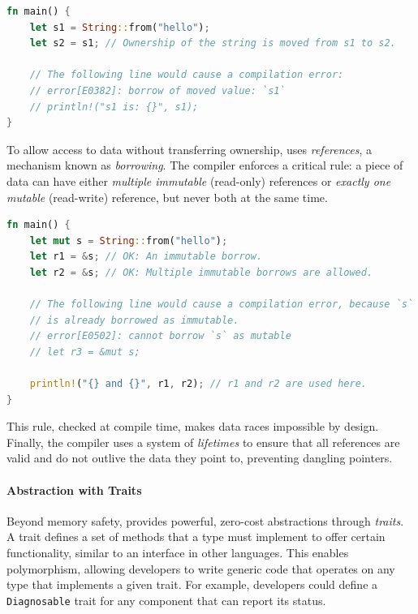 \begin{lstlisting}[language=Rust]
fn main() {
    let s1 = String::from("hello");
    let s2 = s1; // Ownership of the string is moved from s1 to s2.

    // The following line would cause a compilation error:
    // error[E0382]: borrow of moved value: `s1`
    // println!("s1 is: {}", s1);
}
\end{lstlisting}

To allow access to data without transferring ownership, \Rust uses \emph{references}, a mechanism
known as \emph{borrowing}. The compiler enforces a critical rule: a piece of data can have either
\emph{multiple immutable} (read-only) references or \emph{exactly one mutable} (read-write)
reference, but never both at the same time.

\begin{lstlisting}[language=Rust]
fn main() {
    let mut s = String::from("hello");
    let r1 = &s; // OK: An immutable borrow.
    let r2 = &s; // OK: Multiple immutable borrows are allowed.

    // The following line would cause a compilation error, because `s`
    // is already borrowed as immutable.
    // error[E0502]: cannot borrow `s` as mutable
    // let r3 = &mut s;

    println!("{} and {}", r1, r2); // r1 and r2 are used here.
}
\end{lstlisting}
This rule, checked at compile time, makes data races impossible by design. Finally, the compiler
uses a system of \emph{lifetimes} to ensure that all references are valid and do not outlive the
data they point to, preventing dangling pointers.

\paragraph{Abstraction with Traits}
Beyond memory safety, \Rust provides powerful, zero-cost abstractions through \emph{traits}. A trait
defines a set of methods that a type must implement to offer certain functionality, similar to an
interface in other languages. This enables polymorphism, allowing developers to write generic code
that operates on any type that implements a given trait. For example, developers could define a
\texttt{Diagnosable} trait for any component that can report its status.

